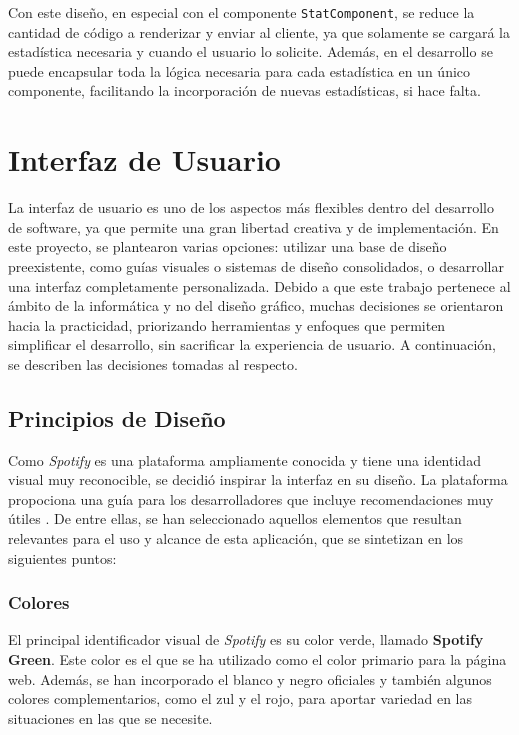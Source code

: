 Con este diseño, en especial con el componente \texttt{StatComponent}, se reduce la cantidad de código a renderizar y enviar al cliente, ya que solamente se cargará la estadística necesaria y cuando el usuario lo solicite. Además, en el desarrollo se puede encapsular toda la lógica necesaria para cada estadística en un único componente, facilitando la incorporación de nuevas estadísticas, si hace falta.

\newpage

\section{Interfaz de Usuario}

La interfaz de usuario es uno de los aspectos más flexibles dentro del desarrollo de software, ya que permite una gran libertad creativa y de implementación. En este proyecto, se plantearon varias opciones: utilizar una base de diseño preexistente, como guías visuales o sistemas de diseño consolidados, o desarrollar una interfaz completamente personalizada. Debido a que este trabajo pertenece al ámbito de la informática y no del diseño gráfico, muchas decisiones se orientaron hacia la practicidad, priorizando herramientas y enfoques que permiten simplificar el desarrollo, sin sacrificar la experiencia de usuario. A continuación, se describen las decisiones tomadas al respecto.

\subsection{Principios de Diseño}

Como \textit{Spotify} es una plataforma ampliamente conocida y tiene una identidad visual muy reconocible, se decidió inspirar la interfaz en su diseño. La plataforma propociona una guía para los desarrolladores que incluye recomendaciones muy útiles \cite{spotifyDesign2025}. De entre ellas, se han seleccionado aquellos elementos que resultan relevantes para el uso y alcance de esta aplicación, que se sintetizan en los siguientes puntos:

\subsubsection*{Colores}

El principal identificador visual de \textit{Spotify} es su color verde, llamado \textbf{Spotify Green}. Este color es el que se ha utilizado como el color primario para la página web. Además, se han incorporado el blanco y negro oficiales y también algunos colores complementarios, como el zul y el rojo, para aportar variedad en las situaciones en las que se necesite.

